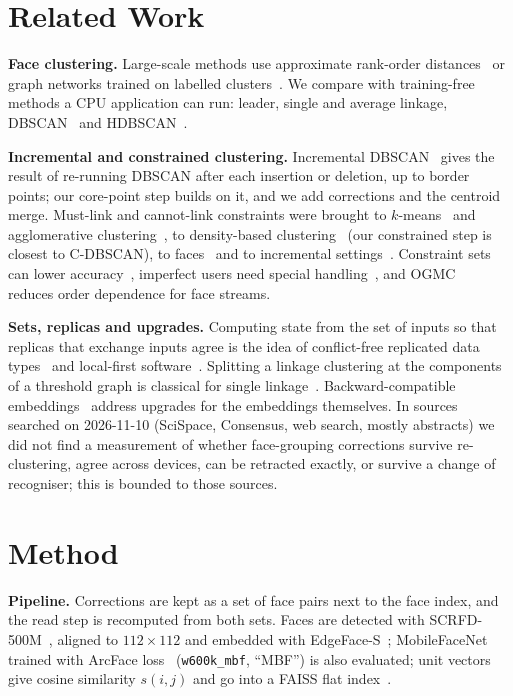 \documentclass[conference]{IEEEtran}
\begin{document}
\section{Related Work}
\textbf{Face clustering.} Large-scale methods use approximate rank-order distances~\cite{otto2018clustering} or graph
networks trained on labelled clusters~\cite{wang2019linkage,yang2019affinity}. We compare with training-free methods a CPU
application can run: leader, single and average linkage, DBSCAN~\cite{ester1996dbscan} and HDBSCAN~\cite{campello2013hdbscan}.

\textbf{Incremental and constrained clustering.} Incremental DBSCAN~\cite{ester1998incremental} gives the result of
re-running DBSCAN after each insertion or deletion, up to border points; our core-point step builds on it, and we add corrections
and the centroid merge. Must-link and cannot-link constraints were brought to $k$-means~\cite{wagstaff2001copkmeans} and
agglomerative clustering~\cite{davidson2005agglomerative}, to density-based clustering~\cite{ruiz2007cdbscan} (our constrained
step is closest to C-DBSCAN), to faces~\cite{shi2018conpac} and to incremental
settings~\cite{davidson2007incremental,monath2019grinch}. Constraint sets can lower accuracy~\cite{davidson2006utility}, imperfect
users need special handling~\cite{zhu2016imperfect}, and OGMC~\cite{montero2022ogmc} reduces order dependence
for face streams.

\textbf{Sets, replicas and upgrades.} Computing state from the set of inputs so that replicas that exchange inputs agree is
the idea of conflict-free replicated data types~\cite{shapiro2011crdt} and local-first software~\cite{kleppmann2019local}.
Splitting a linkage clustering at the components of a threshold graph is classical for single
linkage~\cite{gower1969mst,sibson1973slink}. Backward-compatible embeddings~\cite{shen2020backward} address upgrades for the
embeddings themselves. In sources searched on 2026-11-10 (SciSpace, Consensus, web search, mostly abstracts) we did not find a
measurement of whether face-grouping corrections survive re-clustering, agree across devices, can be retracted exactly, or
survive a change of recogniser; this is bounded to those sources.

\section{Method}\label{sec:method}
\textbf{Pipeline.} Corrections are kept as a set of face pairs next to the face index, and the read step is recomputed from both sets. Faces are detected with SCRFD-500M~\cite{guo2022scrfd}, aligned to $112\times112$
and embedded with EdgeFace-S~\cite{george2024edgeface}; MobileFaceNet~\cite{chen2018mobilefacenets} trained with ArcFace loss~\cite{deng2019arcface} (\texttt{w600k\_mbf}, ``MBF'') is also evaluated; unit vectors give
cosine similarity $s(i,j)$ and go into a FAISS flat index~\cite{johnson2021faiss}.
\end{document}
